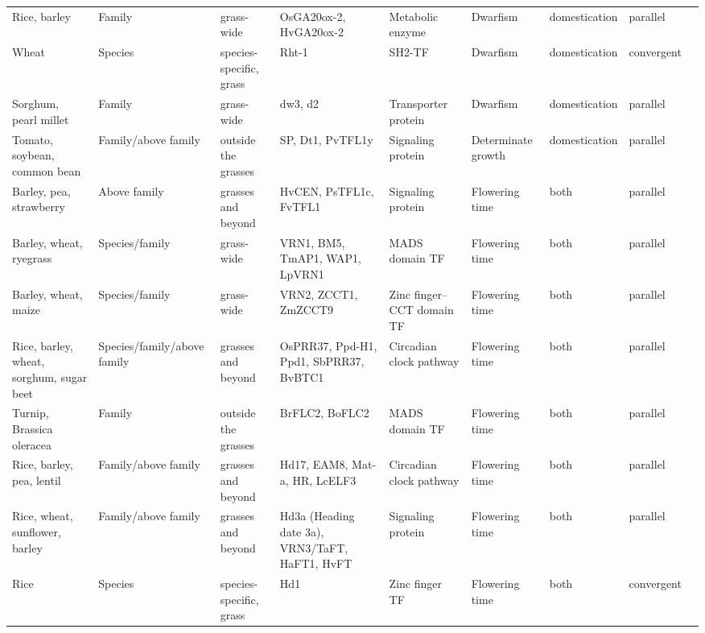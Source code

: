 \documentclass[12pt]{article}
\begin{document}
\begin{table}
\begin{center}
\begin{tabular}{G{3.5cm}G{2.5cm}C{3.10cm}C{3.5cm}C{1.95cm}G{2.0cm}G{1.8cm}G{1.5cm}G{1.5cm}}
Rice, barley & Family & grass-wide & OsGA20ox-2, HvGA20ox-2 & Metabolic enzyme & Dwarfism & domestication & parallel & \citep{Asano2007, Asano2011, Jia2009}\\
Wheat & Species & species-specific, grass & Rht-1 & SH2-TF & Dwarfism & domestication & convergent & \citep{Doebley2006}\\
Sorghum, pearl millet & Family & grass-wide & dw3, d2 & Transporter protein & Dwarfism & domestication & parallel & \citep{Multani2003,Parvathaneni2013}\\
Tomato, soybean, common bean & Family/above family & outside the grasses & SP, Dt1, PvTFL1y & Signaling protein & Determinate growth & domestication & parallel & \citep{Doebley2006, Repinski2012, Liu2010, Kwak2012, Tian2010}\\
Barley, pea, strawberry & Above family & grasses and beyond & HvCEN, PsTFL1c, FvTFL1 & Signaling protein & Flowering time & both & parallel & \citep{Comadran2012, Foucher2003, Koskela2012}\\
Barley, wheat, ryegrass & Species/family & grass-wide & VRN1, BM5, TmAP1, WAP1, LpVRN1 & MADS domain TF & Flowering time & both & parallel & \citep{Asp2011}\\
Barley, wheat, maize & Species/family & grass-wide & VRN2, ZCCT1, ZmZCCT9 & Zinc finger–CCT domain TF & Flowering time & both & parallel & \citep{Huang2017}\\
Rice, barley, wheat, sorghum, sugar beet & Species/family/above family & grasses and beyond & OsPRR37, Ppd-H1, Ppd1, SbPRR37, BvBTC1 & Circadian clock pathway & Flowering time & both & parallel & \citep{MURAKAMI2005, Turner2005, Jones2008, Beales2007, Wilhelm2008, Daz2012}\\
Turnip, Brassica oleracea & Family & outside the grasses & BrFLC2, BoFLC2 & MADS domain TF & Flowering time & both & parallel & \citep{Wu2012, Yuan2009, Okazaki2006}\\
Rice, barley, pea, lentil & Family/above family & grasses and beyond & Hd17, EAM8, Mat-a, HR, LcELF3 & Circadian clock pathway & Flowering time & both & parallel & \citep{Weller2012, Matsubara2012, Zakhrabekova2012, Faure2012}\\
Rice, wheat, sunflower, barley & Family/above family & grasses and beyond & Hd3a (Heading date 3a), VRN3/TaFT, HaFT1, HvFT & Signaling protein & Flowering time & both & parallel & \citep{Yan2006, Takahashi2009, Blackman2010}\\
Rice & Species & species-specific, grass & Hd1 & Zinc finger TF & Flowering time & both & convergent & \citep{Martin2013}\\

\end{tabular}
\end{center}
\end{table}
\end{document}
